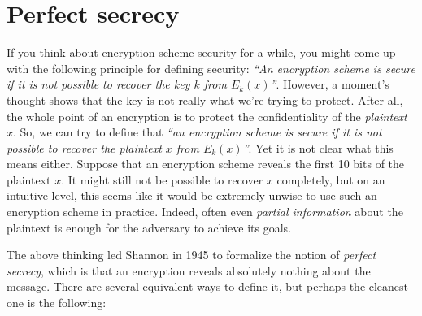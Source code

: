 \section{Perfect secrecy}\label{Perfect-secrecy}

If you think about encryption scheme security for a while, you might
come up with the following principle for defining security: \emph{``An
encryption scheme is secure if it is not possible to recover the key
\(k\) from \(E_k(x)\)''}. However, a moment's thought shows that the key
is not really what we're trying to protect. After all, the whole point
of an encryption is to protect the confidentiality of the
\emph{plaintext} \(x\). So, we can try to define that \emph{``an
encryption scheme is secure if it is not possible to recover the
plaintext \(x\) from \(E_k(x)\)''}. Yet it is not clear what this means
either. Suppose that an encryption scheme reveals the first 10 bits of
the plaintext \(x\). It might still not be possible to recover \(x\)
completely, but on an intuitive level, this seems like it would be
extremely unwise to use such an encryption scheme in practice. Indeed,
often even \emph{partial information} about the plaintext is enough for
the adversary to achieve its goals.

The above thinking led Shannon in 1945 to formalize the notion of
\emph{perfect secrecy}, which is that an encryption reveals absolutely
nothing about the message. There are several equivalent ways to define
it, but perhaps the cleanest one is the following:

\hypertarget{perfectsecrecy}{}

